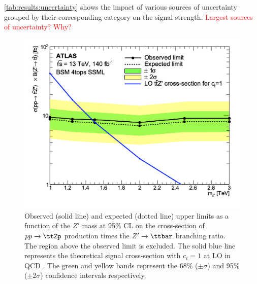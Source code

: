 \documentclass[../thesis.tex]{subfiles}
\begin{document}
\autoref{tab:results:uncertainty} shows the impact of various sources of uncertainty grouped by their corresponding category on the signal strength. \textcolor{red}{Largest sources of uncertainty? Why?}


\begin{figure}[!htb]
\centering
\includegraphics[width=0.7\linewidth]{fig/SRunblinded/ttZp_limits_fb.png}
\caption[Observed (solid line) and expected (dotted line) upper limits as a function of the $Z'$ mass at 95\% \acs{CL} on the cross-section of $pp\rightarrow\ttZp$ production times the $Z'\rightarrow\ttbar$ branching ratio. The region above the observed limit is excluded. The solid blue line represents the theoretical signal cross-section with $c_t=1$ at \acs{LO} in \acs{QCD}. The green and yellow bands represent the 68\% ($\pm\sigma$) and 95\% ($\pm 2\sigma$) confidence intervals respectively.]{\label{fig:results:ttZp_limits}Observed (solid line) and expected (dotted line) upper limits as a function of the $Z'$ mass at 95\% \acs{CL} on the cross-section of $pp\rightarrow\ttZp$ production times the $Z'\rightarrow\ttbar$ branching ratio. The region above the observed limit is excluded. The solid blue line represents the theoretical signal cross-section with $c_t=1$ at \acs{LO} in \acs{QCD} \citep{theory:ttZp_LHC}. The green and yellow bands represent the 68\% ($\pm\sigma$) and 95\% ($\pm 2\sigma$) confidence intervals respectively.}
\end{figure}
\end{document}
